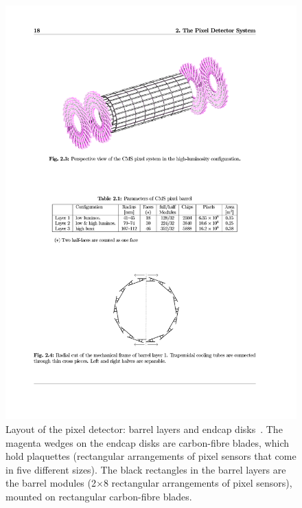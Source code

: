 \begin{figure}[hbtp]
  \begin{center}
    \includegraphics[width=2.0\cmsFigWidth]{figures/cms-pixellayout}
    \caption{Layout of the pixel detector: barrel layers and endcap disks~\cite{Karimaki:368412}. The magenta wedges on the endcap disks are carbon-fibre blades, which hold plaquettes (rectangular arrangements of pixel sensors that come in five different sizes). The black rectangles in the barrel layers are the barrel modules (2$\times$8 rectangular arrangements of pixel sensors), mounted on rectangular carbon-fibre blades.}
    \label{fig:cms-pixellayout}
  \end{center}
\end{figure}

